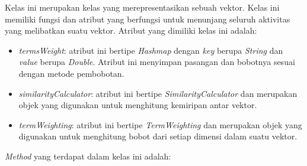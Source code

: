 Kelas ini merupakan kelas yang merepresentasikan sebuah vektor. Kelas ini memiliki fungsi dan atribut yang berfungsi untuk menunjang seluruh aktivitas yang melibatkan suatu vektor. Atribut yang dimiliki kelas ini adalah:

\begin{itemize}
	\item \textit{termsWeight}: atribut ini bertipe \textit{Hashmap} dengan \textit{key} berupa \textit{String} dan \textit{value} berupa \textit{Double}. Atribut ini menyimpan pasangan \term dan bobotnya sesuai dengan metode pembobotan.
	\item \textit{similarityCalculator}: atribut ini bertipe \textit{SimilarityCalculator} dan merupakan objek yang digunakan untuk menghitung kemiripan antar vektor.
	\item \textit{termWeighting}: atribut ini bertipe \textit{TermWeighting} dan merupakan objek yang digunakan untuk menghitung bobot dari setiap dimensi dalam suatu vektor.
\end{itemize}

\textit{Method} yang terdapat dalam kelas ini adalah:

